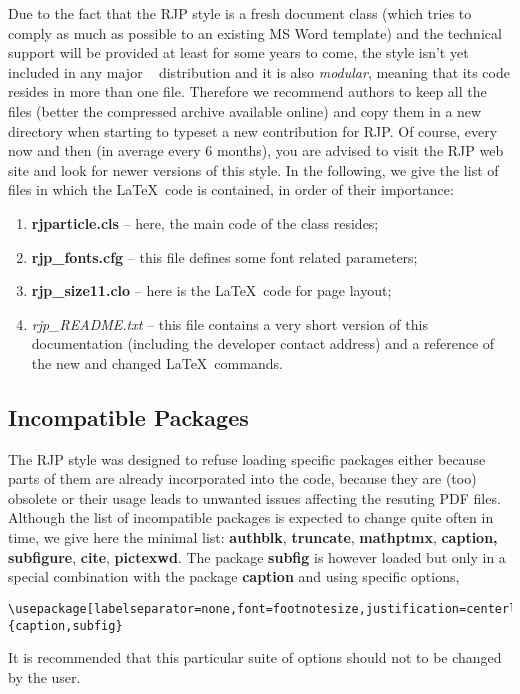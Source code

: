 \documentclass[myclassdoc,debug]{rjparticle}
\begin{document}
Due to the fact that the RJP style is a fresh document class (which tries to comply as much as possible to an existing MS Word template) and the technical support will be provided at least for some years to come, the style isn't yet included in any major \LaTeXe~ distribution and it is also \textit{modular}, meaning that its code resides in more than one file. Therefore we recommend authors to keep all the files (better the compressed archive available online) and copy them in a new directory when starting to typeset a new contribution for RJP. Of course, every now and then (in average every 6 months), you are advised to visit the RJP web site and look for newer versions of this style. In the following, we give the list of files in which the \LaTeX~code is contained, in order of their importance:
\begin{enumerate}
\item \textbf{rjparticle.cls} -- here, the main code of the class resides;
\item \textbf{rjp\_fonts.cfg} -- this file defines some font related parameters;
\item \textbf{rjp\_size11.clo} -- here is the \LaTeX ~code for page layout;
\item \textit{rjp\_README.txt} -- this file contains a very short version of this documentation (including the developer contact address) and a reference of the new and changed \LaTeX ~commands.
\end{enumerate}

\subsection{Incompatible Packages}

The RJP style was designed to refuse loading specific packages either because parts of them are already incorporated into the code, because they are (too) obsolete or their usage leads to unwanted issues affecting the resuting PDF files. Although the list of incompatible packages is expected to change quite often in time, we give here the minimal list: \textbf{authblk}, \textbf{truncate}, \textbf{mathptmx}, \textbf{caption, subfigure}, \textbf{cite}, \textbf{pictexwd}. The package \textbf{subfig} is however loaded but only in a special combination with the package \textbf{caption} and using specific options, \ie
\begin{lstlisting}
\usepackage[labelseparator=none,font=footnotesize,justification=centerlast]{caption,subfig}
\end{lstlisting}
It is recommended that this particular suite of options should not to be changed by the user.
\end{document}
